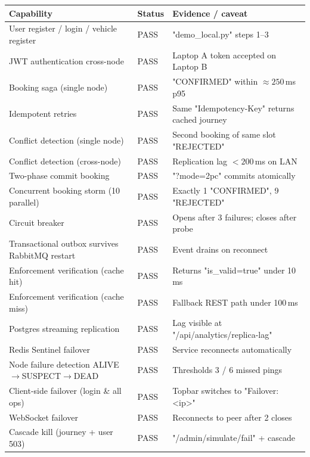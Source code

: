 \documentclass[11pt,a4paper]{article}
\begin{document}
\begin{table}[H]
\centering\footnotesize
\begin{tabularx}{\textwidth}{L{4.8cm} L{1.2cm} X}
  \toprule
  \textbf{Capability} & \textbf{Status} & \textbf{Evidence / caveat} \\
  \midrule
  User register / login / vehicle register & PASS & "demo\_local.py" steps 1--3 \\
  JWT authentication cross-node            & PASS & Laptop A token accepted on Laptop B \\
  Booking saga (single node)               & PASS & "CONFIRMED" within ${\approx}250$\,ms p95 \\
  Idempotent retries                       & PASS & Same "Idempotency-Key" returns cached journey \\
  Conflict detection (single node)         & PASS & Second booking of same slot "REJECTED" \\
  Conflict detection (cross-node)          & PASS & Replication lag ${<}200$\,ms on LAN \\
  Two-phase commit booking                 & PASS & "?mode=2pc" commits atomically \\
  Concurrent booking storm (10 parallel)   & PASS & Exactly 1 "CONFIRMED", 9 "REJECTED" \\
  Circuit breaker                          & PASS & Opens after 3 failures; closes after probe \\
  Transactional outbox survives RabbitMQ restart & PASS & Event drains on reconnect \\
  Enforcement verification (cache hit)     & PASS & Returns "is\_valid=true" under 10\,ms \\
  Enforcement verification (cache miss)    & PASS & Fallback REST path under 100\,ms \\
  Postgres streaming replication           & PASS & Lag visible at "/api/analytics/replica-lag" \\
  Redis Sentinel failover                  & PASS & Service reconnects automatically \\
  Node failure detection ALIVE$\to$SUSPECT$\to$DEAD & PASS & Thresholds 3 / 6 missed pings \\
  Client-side failover (login \& all ops)  & PASS & Topbar switches to "Failover: <ip>" \\
  WebSocket failover                       & PASS & Reconnects to peer after 2 closes \\
  Cascade kill (journey + user 503)        & PASS & "/admin/simulate/fail" + cascade \\

\end{tabularx}
\end{table}
\end{document}
